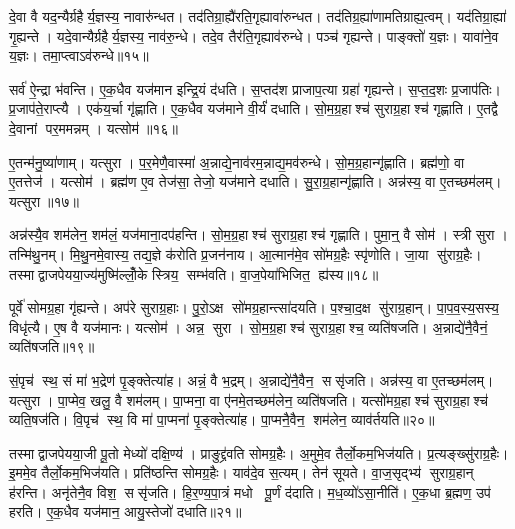 दे॒वा वै यद॒न्यैर्ग्रहैर्य॒ज्ञस्य॒ नावारु॑न्धत। तद॑तिग्रा॒ह्यै॑रति॒\-गृह्या\-वा॑रुन्धत। तद॑तिग्र॒ह्या॑णामतिग्राह्य॒त्वम्। यद॑तिग्रा॒ह्या॑ गृ॒ह्यन्ते। यदे॒वान्यैर्ग्रहैर्य॒ज्ञस्य॒ नाव॑रु॒न्धे। तदे॒व तैर॑ति॒गृह्या\-व॑रुन्धे। पञ्च॑ गृह्यन्ते। पाङ्क्तो॑ य॒ज्ञः। यावा॑ने॒व य॒ज्ञः। तमा॒प्त्वाऽव॑रुन्धे॥१५॥

सर्व॑ ऐ॒न्द्रा भ॑वन्ति। ए॒क॒धैव यज॑मान इन्द्रि॒यं द॑धति। स॒प्तद॑श प्राजाप॒त्या ग्रहा॑ गृह्यन्ते। स॒प्त॒द॒शः प्र॒जाप॑तिः। प्र॒जाप॑ते॒राप्त्यै। एक॑य॒र्चा गृ॑ह्णाति। ए॒क॒धैव यज॑माने वी॒र्यं॑ दधाति। सो॒म॒ग्र॒हाश्च॑ सुराग्र॒हाश्च॑ गृह्णाति। ए॒तद्वै दे॒वानां पर॒ममन्नम्। यत्सोम॑॥१६॥

ए॒तन्म॑नु॒ष्या॑णाम्। यत्सुरा। प॒र॒मेणै॒वास्मा॑ अ॒न्नाद्ये॒नाव॑र\-म॒न्नाद्य॒मव॑रुन्धे। सो॒म॒ग्र॒हान्गृ॑ह्णाति। ब्रह्म॑णो॒ वा ए॒तत्तेज॑। यत्सोम॑। ब्रह्म॑ण ए॒व तेज॑सा॒ तेजो॒ यज॑माने दधाति। सु॒रा॒ग्र॒हान्गृ॑ह्णाति। अन्न॑स्य॒ वा ए॒तच्छम॑लम्। यत्सुरा॥१७॥

अन्न॑स्यै॒व शम॑लेन॒ शम॑लं॒ यज॑माना॒दप॑हन्ति। सो॒म॒ग्र॒हाश्च॑ सुराग्र॒हाश्च॑ गृह्णाति। पुमा॒न्॒ वै सोम॑। स्त्री सुरा। तन्मि॑थु॒नम्। मि॒थु॒नमे॒वास्य॒ तद्य॒ज्ञे क॑रोति प्र॒जन॑नाय। आ॒त्मान॑मे॒व सो॑मग्र॒हैः स्पृ॑णोति। जा॒या सु॑राग्र॒हैः। तस्माद्वाजपेयया॒ज्य॑मुष्मि॑ल्लोँ॒के स्त्रिय॒ सम्भ॑वति। वा॒ज॒पेया॑भिजित॒ ह्य॑स्य॥१८॥

पूर्वे॑ सोमग्र॒हा गृ॑ह्यन्ते। अप॑रे सुराग्र॒हाः। पु॒रो॒ऽक्ष सो॑मग्र॒हान्त्सा॑दयति। प॒श्चा॒द॒क्ष सु॑राग्र॒हान्। पा॒प॒व॒स्य॒सस्य॒ विधृ॑त्यै। ए॒ष वै यज॑मानः। यत्सोम॑। अन्न॒ सुरा। सो॒म॒ग्र॒हाश्च॑ सुराग्र॒हाश्च॒ व्यति॑षजति। अ॒न्नाद्ये॑नै॒वैनं॒ व्यति॑षजति॥१९॥

सं॒पृच॑ स्थ॒ सं मा॑ भ॒द्रेण॑ पृ॒ङ्क्तेत्या॑ह। अन्नं॒ वै भ॒द्रम्। अ॒न्नाद्ये॑नै॒वैन॒ ससृ॑जति। अन्न॑स्य॒ वा ए॒तच्छम॑लम्। यत्सुरा। पा॒प्मेव॒ खलु॒ वै शम॑लम्। पा॒प्मना॒ वा ए॑नमे॒तच्छम॑लेन॒ व्यति॑षजति। यत्सो॑मग्र॒हाश्च॑ सुराग्र॒हाश्च॑ व्यति॒षज॑ति। वि॒पृच॑ स्थ॒ वि मा॑ पा॒प्मना॑ पृ॒ङ्क्तेत्या॑ह। पा॒प्मनै॒वैन॒ शम॑लेन॒ व्याव॑र्तयति॥२०॥

तस्माद्वाजपेयया॒जी पू॒तो मेध्यो॑ दक्षि॒ण्य॑। प्राङुद्द्र॑वति सोमग्र॒हैः। अ॒मुमे॒व तैर्लो॒कम॒भिज॑यति। प्र॒त्यङ्ख्सु॑राग्र॒हैः। इ॒ममे॒व तैर्लो॒कम॒भिज॑यति। प्रति॑ष्ठन्ति सोमग्र॒हैः। याव॑दे॒व स॒त्यम्। तेन॑ सूयते। वा॒ज॒सृद्भ्य॑ सुराग्र॒हान् ह॑रन्ति। अनृ॑तेनै॒व विश॒ ससृ॑जति। हि॒र॒ण्य॒पा॒त्रं मधो पू॒र्णं द॑दाति। म॒ध॒व्यो॑ऽसा॒नीति॑। ए॒क॒धा ब्र॒ह्मण॒ उप॑ हरति। ए॒क॒धैव यज॑मान॒ आयु॒स्तेजो॑ दधाति॥२१॥

